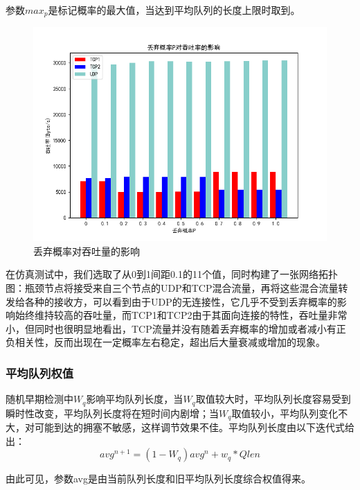 \documentclass{article}
\begin{document}
参数$max_p$是标记概率的最大值，当达到平均队列的长度上限时取到。

\begin{figure}[H]
	\centering
	\includegraphics[scale=0.6]{picture/p.png}
	\caption{丢弃概率对吞吐量的影响}
	\label{fig:p}
\end{figure}

在仿真测试中，我们选取了从0到1间距0.1的11个值，同时构建了一张网络拓扑图：瓶颈节点将接受来自三个节点的UDP和TCP混合流量，再将这些混合流量转发给各种的接收方，可以看到由于UDP的无连接性，它几乎不受到丢弃概率的影响始终维持较高的吞吐量，而TCP1和TCP2由于其面向连接的特性，吞吐量非常小，但同时也很明显地看出，TCP流量并没有随着丢弃概率的增加或者减小有正负相关性，反而出现在一定概率左右稳定，超出后大量衰减或增加的现象。

\subsubsection{平均队列权值}
随机早期检测中$W_q$影响平均队列长度，当$W_q$取值较大时，平均队列长度容易受到瞬时性改变，平均队列长度将在短时间内剧增；当$W_q$取值较小，平均队列变化不大，对可能到达的拥塞不敏感，这样调节效果不佳。平均队列长度由以下迭代式给出：
\begin{equation*}
	avg^{n+1}=(1-W_q)avg^{n}+w_q*Qlen
\end{equation*}

由此可见，参数avg是由当前队列长度和旧平均队列长度综合权值得来。
\end{document}
